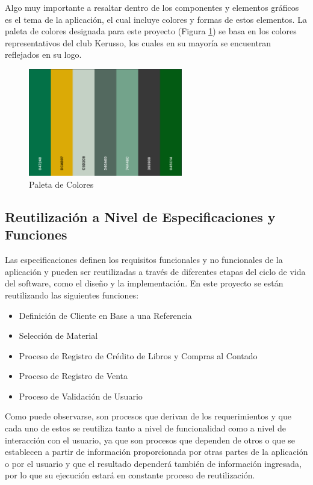 \documentclass[runningheads]{llncs}
\begin{document}
                Algo muy importante a resaltar dentro de los componentes y elementos gráficos es el tema de la aplicación, el cual incluye colores y formas de estos elementos.
                La paleta de colores designada para este proyecto (Figura \ref{fig12}) se basa en los colores representativos del club Kerusso, los cuales en su mayoría se encuentran reflejados en su logo.
                \begin{figure}[H]
                    \centering\captionsetup{width=0.8\textwidth}
                    \includegraphics[width=0.6\textwidth]{figures/graphic_components/colors.png}
                    \caption{Paleta de Colores} \label{fig12}
                \end{figure}

            \subsection*{Reutilización a Nivel de Especificaciones y Funciones}
                Las especificaciones definen los requisitos funcionales y no funcionales de la aplicación y pueden ser reutilizadas a través de diferentes etapas del ciclo de vida del software, como el diseño y la implementación.
                En este proyecto se están reutilizando las siguientes funciones:
                \begin{itemize}
                    \item Definición de Cliente en Base a una Referencia
                    \item Selección de Material
                    \item Proceso de Registro de Crédito de Libros y Compras al Contado
                    \item Proceso de Registro de Venta
                    \item Proceso de Validación de Usuario
                \end{itemize}
                Como puede observarse, son procesos que derivan de los requerimientos y que cada uno de estos se reutiliza tanto a nivel de funcionalidad como a nivel de interacción con el usuario, ya que son procesos que dependen de otros o que se establecen a partir de información proporcionada por otras partes de la aplicación o por el usuario y que el resultado dependerá también de información ingresada, por lo que su ejecución estará en constante proceso de reutilización.
\end{document}
